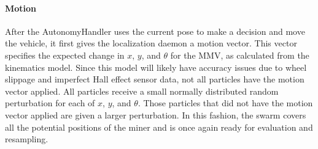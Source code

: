 \paragraph{Motion}
After the AutonomyHandler uses the current pose to make a decision and move the vehicle, it first gives the localization daemon a motion vector.  This vector specifies the expected change in $x$, $y$, and $\theta$ for the MMV, as calculated from the kinematics model.  Since this model will likely have accuracy issues due to wheel slippage and imperfect Hall effect sensor data, not all particles have the motion vector applied.  All particles receive a small normally distributed random perturbation for each of $x$, $y$, and $\theta$.  Those particles that did not have the motion vector applied are given a larger perturbation.  In this fashion, the swarm covers all the potential positions of the miner and is once again ready for evaluation and resampling.
